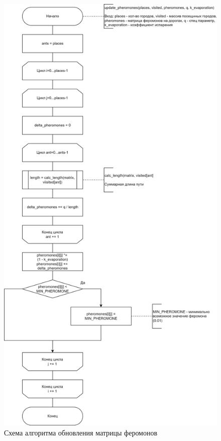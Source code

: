 \begin{figure}[h]
	\centering
	\includegraphics[height=0.9\textheight]{img/update.png}
	\caption{Схема алгоритма обновления матрицы феромонов}
	\label{fig:update}
\end{figure}

